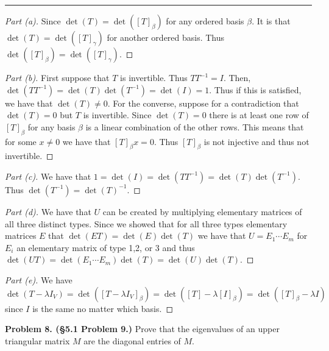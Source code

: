 \documentclass[leqno]{article}
\theoremstyle{nonumberplain}
\newtheorem{proof}{Proof}
\begin{document}
\noindent\rule[0.5ex]{\linewidth}{1pt}

\begin{proof}[Part (a)]
Since $\det(T)=\det([T]_\beta)$ for any ordered basis $\beta$. It is that $\det(T)=\det([T]_\gamma)$ for another ordered basis.  Thus $\det([T]_\beta)=\det([T]_\gamma)$.
\end{proof}

\begin{proof}[Part (b)]
First suppose that $T$ is invertible.  Thus $TT^{-1}=I$.  Then, $\det(TT^{-1})=\det(T)\det(T^{-1})=\det(I)=1$.  Thus if this is satisfied, we have that $\det(T)\neq 0$.  For the converse, suppose for a contradiction that $\det(T)=0$ but $T$ is invertible.  Since $\det(T)=0$ there is at least one row of $[T]_\beta$ for any basis $\beta$ is a linear combination of the other rows.  This means that for some $x\neq 0$ we have that $[T]_\beta x = 0$.  Thus $[T]_\beta$ is not injective and thus not invertible.  
\end{proof}

\begin{proof}[Part (c)]
We have that $1=\det(I)=\det(TT^{-1})=\det(T)\det(T^{-1})$.  Thus $\det(T^{-1})=\det(T)^{-1}$.
\end{proof}

\begin{proof}[Part (d)]
We have that $U$ can be created by multiplying elementary matrices of all three distinct types.  Since we showed that for all three types elementary matrices $E$ that $\det(ET)=\det(E)\det(T)$ we have that $U=E_1 \cdots E_m$ for $E_i$ an elementary matrix of type 1,2, or 3 and thus $\det(UT)=\det(E_1 \cdots E_m)\det(T)=\det(U)\det(T)$.
\end{proof}

\begin{proof}[Part (e)]
We have $\det(T-\lambda I_V)=\det([T-\lambda I_V]_\beta)=\det([T]-\lambda [I]_\beta)=\det([T]_\beta-\lambda I)$ since $I$ is the same no matter which basis.  
\end{proof}

\pagebreak




\noindent\textbf{Problem 8. (\S 5.1 Problem 9.)} Prove that the eigenvalues of an upper triangular matrix $M$ are the diagonal entries of $M$.
\end{document}
